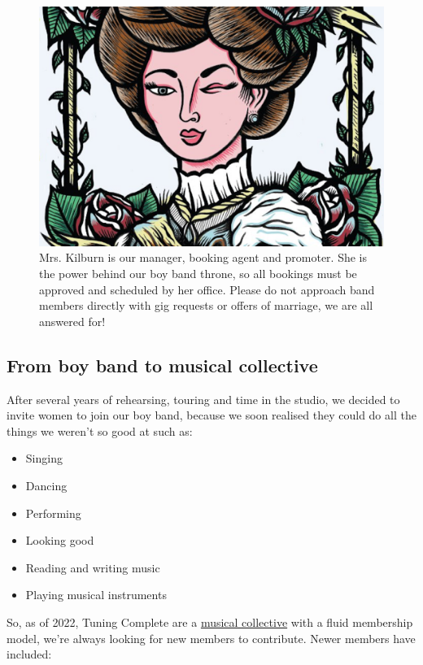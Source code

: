 \documentclass[
  12pt,
]{book}
\providecommand{\tightlist}{%
  \setlength{\itemsep}{0pt}\setlength{\parskip}{0pt}}
\begin{document}
\begin{figure}

{\centering \includegraphics[width=0.7\linewidth]{images/mrs-kilburn} 

}

\caption{Mrs. Kilburn is our manager, booking agent and promoter. She is the power behind our boy band throne, so all bookings must be approved and scheduled by her office. Please do not approach band members directly with gig requests or offers of marriage, we are all answered for!}\label{fig:mrskilburn-fig}
\end{figure}

\hypertarget{collective}{%
\subsection{From boy band to musical collective}\label{collective}}

After several years of rehearsing, touring and time in the studio, we decided to invite women to join our boy band, because we soon realised they could do all the things we weren't so good at such as:

\begin{itemize}
\tightlist
\item
  Singing
\item
  Dancing
\item
  Performing
\item
  Looking good
\item
  Reading and writing music
\item
  Playing musical instruments
\end{itemize}

So, as of 2022, Tuning Complete are a \href{https://en.wikipedia.org/wiki/Musical_collective}{musical collective} with a fluid membership model, we're always looking for new members to contribute. Newer members have included:
\end{document}
